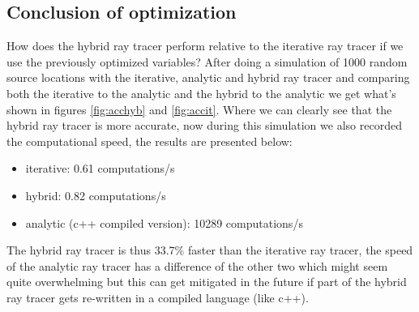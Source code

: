 \documentclass[11pt,a4paper,faculty=we,language=en,doctype=report]{cls/ugent-doc}
\begin{document}
\subsection{Conclusion of optimization}
How does the hybrid ray tracer perform relative to the iterative ray tracer if we use 
the previously optimized variables? After doing a simulation of 1000 random source locations with
the iterative, analytic and hybrid ray tracer and comparing both the iterative to the analytic and the hybrid to the analytic
we get what's shown in figures \ref{fig:acchyb} and \ref{fig:accit}. Where we can clearly see that the hybrid
ray tracer is more accurate, now during this simulation we also recorded the computational speed, the results
are presented below:
\begin{itemize}
	\item iterative: 0.61 computations/s
	\item hybrid: 0.82 computations/s
	\item analytic (c++ compiled version): 10289 computations/s
\end{itemize}
The hybrid ray tracer is thus 33.7\% faster than the iterative ray tracer, the speed of the analytic ray tracer
has a difference of the other two which might seem quite overwhelming but this can get mitigated in the future if 
part of the hybrid ray tracer gets re-written in a compiled language (like c++).
\end{document}
